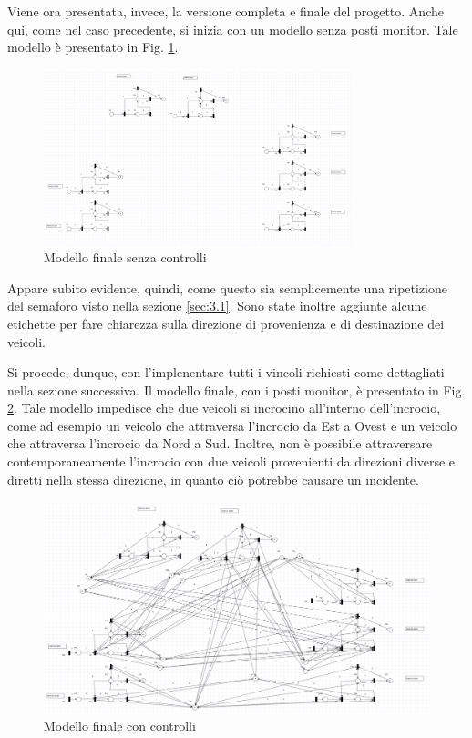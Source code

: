 Viene ora presentata, invece, la versione completa e finale del progetto. Anche qui, come nel caso precedente, si inizia con un modello senza posti monitor. Tale modello è presentato in Fig. \ref{fig:semafori_finale}.

\begin{figure}[ht]
    \centering
    \includegraphics[width=0.8\textwidth]{figure/project_screenshots/semafori_finale.png}
    \caption{Modello finale senza controlli}
    \label{fig:semafori_finale}
\end{figure}

Appare subito evidente, quindi, come questo sia semplicemente una ripetizione del semaforo visto nella sezione \ref{sec:3.1}. Sono state inoltre aggiunte alcune etichette per fare chiarezza sulla direzione di provenienza e di destinazione dei veicoli.

Si procede, dunque, con l'implenentare tutti i vincoli richiesti come dettagliati nella sezione successiva. Il modello finale, con i posti monitor, è presentato in Fig. \ref{fig:semafori_finale_monitor}. Tale modello impedisce che due veicoli si incrocino all'interno dell'incrocio, come ad esempio un veicolo che attraversa l'incrocio da Est a Ovest e un veicolo che attraversa l'incrocio da Nord a Sud. Inoltre, non è possibile attraversare contemporaneamente l'incrocio con due veicoli provenienti da direzioni diverse e diretti nella stessa direzione, in quanto ciò potrebbe causare un incidente.

\begin{figure}[htb]
    \centering
    \includegraphics[width=1.0\textwidth]{figure/project_screenshots/semafori_finale_2.png}
    \caption{Modello finale con controlli}
    \label{fig:semafori_finale_monitor}
\end{figure}